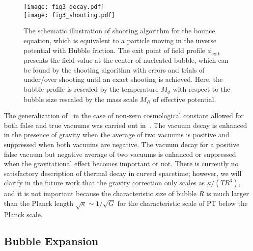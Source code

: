 \documentclass[a4paper,11pt]{article}
\begin{document}
\begin{figure}
  \centering
  \texttt{[image: fig3\_decay.pdf]}\\
  \texttt{[image: fig3\_shooting.pdf]}\\
  \caption{The schematic illustration of shooting algorithm for the bounce equation, which is equivalent to a particle moving in the inverse potential with Hubble friction. The exit point of field profile $\phi_\mathrm{exit}$ presents the field value at the center of nucleated bubble, which can be found by the shooting algorithm with errors and trials of under/over shooting until an exact shooting is achieved. Here, the bubble profile is rescaled by the temperature $M_\phi$ with respect to the bubble size rescaled by the mass scale $M_R$ of effective potential.}
  \label{fig:decayshooting}
\end{figure}

The generalization of~\cite{Coleman:1977py} in the case of non-zero cosmological constant allowed for both false and true vacuums was carried out in~\cite{Parke:1982pm}. The vacuum decay is enhanced in the presence of gravity when the average of two vacuums is positive and suppressed when both vacuums are negative. The vacuum decay for a positive false vacuum but negative average of two vacuums is enhanced or suppressed when the gravitational effect becomes important or not. There is currently no satisfactory description of thermal decay in curved spacetime; however, we will clarify in the future work that the gravity correction only scales as $\kappa/(TR^3)$, and it is not important because the characteristic size of bubble $R$ is much larger than the Planck length $\sqrt{\kappa}\sim1/\sqrt{G}$ for the characteristic scale of PT below the Planck scale.


\subsection{Bubble Expansion}
\label{subsec:bubble expansion}
\end{document}
